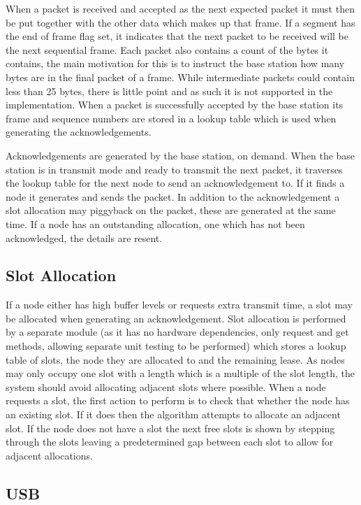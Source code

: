\documentclass[parskip]{cs4rep}
\begin{document}
When a packet is received and accepted as the next expected packet it must then be put together with the other data which makes up that frame. If a segment has the end of frame flag set, it indicates that the next packet to be received will be the next sequential frame. Each packet also contains a count of the bytes it contains, the main motivation for this is to instruct the base station how many bytes are in the final packet of a frame. While intermediate packets could contain less than 25 bytes, there is little point and as such it is not supported in the implementation. When a packet is successfully accepted by the base station its frame and sequence numbers are stored in a lookup table which is used when generating the acknowledgements.

Acknowledgements are generated by the base station, on demand. When the base station is in transmit mode and ready to transmit the next packet, it traverses the lookup table for the next node to send an acknowledgement to. If it finds a node it generates and sends the packet. In addition to the acknowledgement a slot allocation may piggyback on the packet, these are generated at the same time. If a node has an outstanding allocation, one which has not been acknowledged, the details are resent. 

\subsection{Slot Allocation}

If a node either has high buffer levels or requests extra transmit time, a slot may be allocated when generating an acknowledgement. Slot allocation is performed by a separate module (as it has no hardware dependencies, only request and get methods, allowing separate unit testing to be performed) which stores a lookup table of slots, the node they are allocated to and the remaining lease. As nodes may only occupy one slot with a length which is a multiple of the slot length, the system should avoid allocating adjacent slots where possible. When a node requests a slot, the first action to perform is to check that whether the node has an existing slot. If it does then the algorithm attempts to allocate an adjacent slot. If the node does not have a slot the next free slots is shown by stepping through the slots leaving a predetermined gap between each slot to allow for adjacent allocations. 

\subsection{USB}
\end{document}
